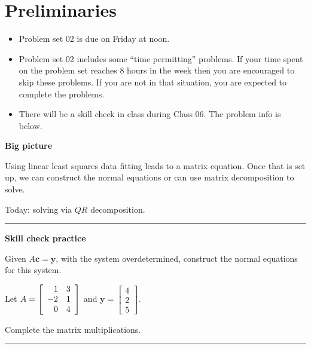 \documentclass[12pt,letterpaper,noanswers]{exam}
\begin{document}
 \pdfpageheight 11in 
  \pdfpagewidth 8.5in


  
\section{Preliminaries}
\begin{itemize}
\itemsep0pt
\item Problem set 02 is due on Friday at noon.
\item Problem set 02 includes some ``time permitting'' problems.  If your time spent on the problem set reaches 8 hours in the week then you are encouraged to skip these problems.  If you are not in that situation, you are expected to complete the problems.
\item There will be a skill check in class during Class 06.  The problem info is below.
\end{itemize}



\noindent\textbf{Big picture}

Using linear least squares data fitting leads to a matrix equation.  Once that is set up, we can construct the normal equations or can use matrix decomposition to solve.

Today: solving via $QR$ decomposition.

\vspace{0.2cm}
\hrule
\vspace{0.2cm}
\noindent \textbf{Skill check practice}
\begin{questions}
\item Given $A\mathbf{c} = \mathbf{y}$, with the system overdetermined, construct the normal equations for this system.

Let $A = \left[\begin{array}{r r}
1 & 3 \\
-2 & 1 \\
0 & 4
\end{array}\right]$ and $\mathbf{y} =  \left[\begin{array}{r}
4 \\ 2 \\ 5 \end{array}\right]$.  

Complete the matrix multiplications.
\end{questions}


\vspace{0.2cm}
\hrule
\vspace{0.2cm}
\end{document}
